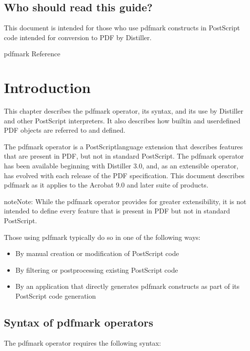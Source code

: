 \documentclass[letterpaper,12pt,english,openany,oneside]{sphinxmanual}
\begin{document}
\section{Who should read this guide?}
\label{\detokenize{index:who-should-read-this-guide}}
This document is intended for those who use pdfmark constructs in PostScript code intended for conversion to PDF by Distiller.

pdfmark Reference


\chapter{Introduction}
\label{\detokenize{pdfmark_Syntax:introduction}}\label{\detokenize{pdfmark_Syntax::doc}}
This chapter describes the pdfmark operator, its syntax, and its use by Distiller and other PostScript interpreters. It also describes how built\sphinxhyphen{}in and user\sphinxhyphen{}defined PDF objects are referred to and defined.

The pdfmark operator is a PostScript\sphinxhyphen{}language extension that describes features that are present in PDF, but not in standard PostScript. The pdfmark operator has been available beginning with Distiller 3.0, and, as an extensible operator, has evolved with each release of the PDF specification. This document describes pdfmark as it applies to the Acrobat 9.0 and later suite of products.

\begin{sphinxadmonition}{note}{Note:}
While the pdfmark operator provides for greater extensibility, it is not intended to define every feature that is present in PDF but not in standard PostScript.
\end{sphinxadmonition}

Those using pdfmark typically do so in one of the following ways:
\begin{itemize}
\item {} 
By manual creation or modification of PostScript code

\item {} 
By filtering or post\sphinxhyphen{}processing existing PostScript code

\item {} 
By an application that directly generates pdfmark constructs as part of its PostScript code generation

\end{itemize}


\section{Syntax of pdfmark operators}
\label{\detokenize{pdfmark_Syntax:syntax-of-pdfmark-operators}}
The pdfmark operator requires the following syntax:
\end{document}
